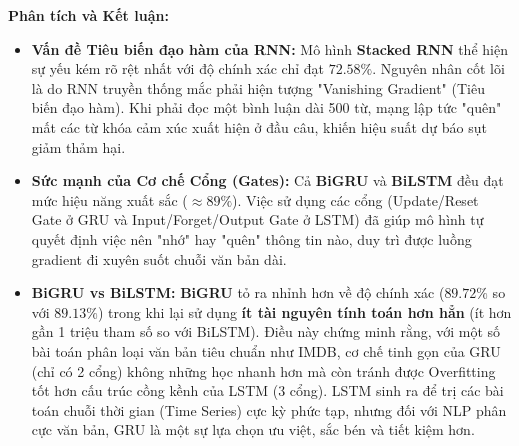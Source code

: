 \begin{table}[H]
    \centering
    \caption{Bảng so sánh hiệu năng của 3 mô hình học sâu trên tập IMDB Reviews}
    \label{tab:imdb_comparison}
\end{table}

\textbf{Phân tích và Kết luận:}
\begin{itemize}
    \item \textbf{Vấn đề Tiêu biến đạo hàm của RNN:} Mô hình \textbf{Stacked RNN} thể hiện sự yếu kém rõ rệt nhất với độ chính xác chỉ đạt $72.58\%$. Nguyên nhân cốt lõi là do RNN truyền thống mắc phải hiện tượng "Vanishing Gradient" (Tiêu biến đạo hàm). Khi phải đọc một bình luận dài 500 từ, mạng lập tức "quên" mất các từ khóa cảm xúc xuất hiện ở đầu câu, khiến hiệu suất dự báo sụt giảm thảm hại.
    \item \textbf{Sức mạnh của Cơ chế Cổng (Gates):} Cả \textbf{BiGRU} và \textbf{BiLSTM} đều đạt mức hiệu năng xuất sắc ($\approx 89\%$). Việc sử dụng các cổng (Update/Reset Gate ở GRU và Input/Forget/Output Gate ở LSTM) đã giúp mô hình tự quyết định việc nên "nhớ" hay "quên" thông tin nào, duy trì được luồng gradient đi xuyên suốt chuỗi văn bản dài.
    \item \textbf{BiGRU vs BiLSTM:} \textbf{BiGRU} tỏ ra nhỉnh hơn về độ chính xác ($89.72\%$ so với $89.13\%$) trong khi lại sử dụng \textbf{ít tài nguyên tính toán hơn hẳn} (ít hơn gần 1 triệu tham số so với BiLSTM). Điều này chứng minh rằng, với một số bài toán phân loại văn bản tiêu chuẩn như IMDB, cơ chế tinh gọn của GRU (chỉ có 2 cổng) không những học nhanh hơn mà còn tránh được Overfitting tốt hơn cấu trúc cồng kềnh của LSTM (3 cổng). LSTM sinh ra để trị các bài toán chuỗi thời gian (Time Series) cực kỳ phức tạp, nhưng đối với NLP phân cực văn bản, GRU là một sự lựa chọn ưu việt, sắc bén và tiết kiệm hơn.
\end{itemize}
